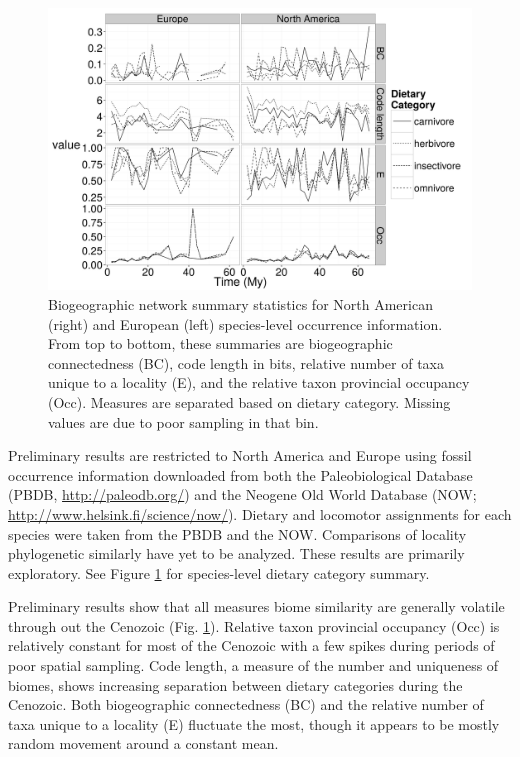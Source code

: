 \documentclass[11pt,letterpaper]{article}
\begin{document}
\begin{figure}[ht]
  \centering
  \includegraphics[width = \textwidth, height = 0.4\textheight, keepaspectratio = true]{figure/diets}
  \caption{Biogeographic network summary statistics for North American (right) and European (left) species-level occurrence information. From top to bottom, these summaries are biogeographic connectedness (BC), code length in bits, relative number of taxa unique to a locality (E), and the relative taxon provincial occupancy (Occ). Measures are separated based on dietary category. Missing values are due to poor sampling in that bin.}
  \label{fig:com}
\end{figure}

Preliminary results are restricted to North America and Europe using fossil occurrence information downloaded from both the Paleobiological Database (PBDB, \url{http://paleodb.org/}) and the Neogene Old World Database (NOW; \url{http://www.helsink.fi/science/now/}). Dietary and locomotor assignments for each species were taken from the PBDB and the NOW. Comparisons of locality phylogenetic similarly have yet to be analyzed. These results are primarily exploratory. See Figure \ref{fig:com} for species-level dietary category summary. %

Preliminary results show that all measures biome similarity are generally volatile through out the Cenozoic (Fig. \ref{fig:com}). Relative taxon provincial occupancy (Occ) is relatively constant for most of the Cenozoic with a few spikes during periods of poor spatial sampling. Code length, a measure of the number and uniqueness of biomes, shows increasing separation between dietary categories during the Cenozoic. Both biogeographic connectedness (BC) and the relative number of taxa unique to a locality (E) fluctuate the most, though it appears to be mostly random movement around a constant mean.
\end{document}
